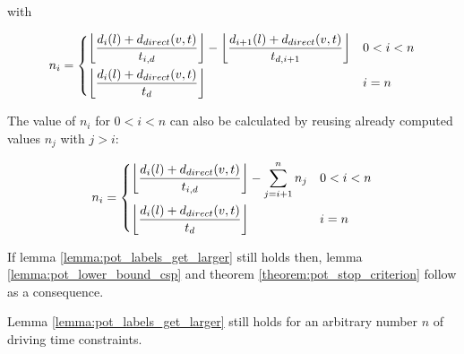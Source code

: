 with

\begin{align*}
	n_i =\begin{dcases}
		\floor*{ \frac{d_{i}(l) + d_{direct}(v,t)}{t_{i,d}} } - \floor*{ \frac{d_{i+1}(l) + d_{direct}(v,t)}{t_{d,i+1}} } & 0 < i < n \\
		\floor*{ \frac{d_{i}(l) + d_{direct}(v,t)}{t_d} }                                                                 & i=n
	\end{dcases}
\end{align*}

The value of $n_i$ for $0 < i < n$ can also be calculated by reusing already computed values $n_j$ with $j > i$:

\begin{align*}
	n_i =\begin{dcases}
		\floor*{ \frac{d_{i}(l) + d_{direct}(v,t)}{t_{i,d}} } - \sum_{j=i+1}^{n}{n_{j} } & 0 < i < n \\
		\floor*{ \frac{d_{i}(l) + d_{direct}(v,t)}{t_d} }                                & i=n
	\end{dcases}
\end{align*}

If lemma \ref{lemma:pot_labels_get_larger} still holds then, lemma \ref{lemma:pot_lower_bound_csp} and theorem \ref{theorem:pot_stop_criterion} follow as a consequence.

\begin{lemma}
	Lemma \ref{lemma:pot_labels_get_larger} still holds for an arbitrary number $n$ of driving time constraints.
\end{lemma}

